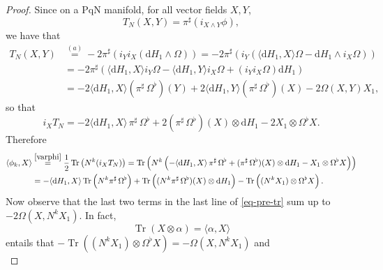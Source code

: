 \documentclass[10pt,a4paper]{amsart}
\def\Tr{\operatorname{Tr}}
\newcommand{\brke}[2]{{{\langle #1,#2\rangle}}}
\def\d{{\mathrm d}}
\begin{document}
\begin{proof} Since on a PqN manifold, for all vector fields $X,Y$, 
\begin{equation}
\label{eq:pre-ThatN}
T_{N}(X,Y)=\pi^\sharp(i_{X\wedge Y}\phi),
\end{equation}
we have that
\begin{equation}
\label{eq:ThatN}
\begin{split}
T_{N}(X,Y)& %
\stackrel{(a)}{=}-2\pi^\sharp(i_Yi_X (\d H_1\wedge\Omega))
=-2\pi^\sharp(i_Y(\langle \d H_1,X\rangle\Omega-\d H_1\wedge i_X\Omega))\\
&=-2\pi^\sharp(\langle \d H_1,X\rangle i_Y\Omega-\langle \d H_1,Y\rangle i_X\Omega+(i_Yi_X\Omega) \d H_1)\\
&=-2\langle \d H_1,X\rangle(\pi^\sharp\,\Omega^\flat)(Y)+2\langle \d H_1,Y\rangle(\pi^\sharp\,\Omega^\flat)(X)-2\Omega(X,Y)X_1,
\end{split}
\end{equation}
so that 
\begin{equation}
\label{eq:5}
i_XT_{N}=-2\langle \d H_1,X\rangle\,\pi^\sharp\,\Omega^\flat
+2(\pi^\sharp\,\Omega^\flat)(X)\otimes \d H_1-2X_1\otimes \Omega^\flat X.
\end{equation}
Therefore %
\begin{equation}
\label{eq-pre-tr}
\begin{split}
\brke{\phi_k}{X} &\stackrel{\eqref{varphi}}{=}\frac12\Tr\left({N}^k(i_{X}T_{N})\right)
=%
\Tr\left({N}^k\left(-\langle \d H_1,X\rangle\,\pi^\sharp\,\Omega^\flat
+(\pi^\sharp\,\Omega^\flat)  (X)\otimes \d H_1
-X_1\otimes \Omega^\flat X\right)\right)\\
&=-%
\langle \d H_1,X\rangle\Tr\left({N}^k\pi^\sharp\,\Omega^\flat\right)
+%
\Tr\left(({N}^k\pi^\sharp\,\Omega^\flat)(X)\otimes \d H_1\right)
-%
\Tr\left(({N}^k X_1)\otimes \Omega^\flat X\right).
\end{split}
\end{equation}
Now observe that the last two terms in the last line of \eqref{eq-pre-tr} sum up to $-2\Omega(X,N^kX_1)$. In fact,
\begin{equation}
\Tr(X\otimes\alpha)=\brke{\alpha}{X}\label{eq:identi} 
\end{equation} 
entails that $-%
\Tr\left(({N}^k X_1)\otimes \Omega^\flat X\right)=-\Omega(X,N^kX_1)$ and
\begin{equation}
\label{eqtr-b}

\end{equation}
\end{proof}
\end{document}
